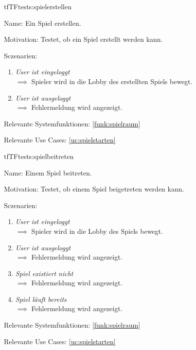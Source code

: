 \begin{description}[leftmargin=5em, style=sameline]
\begin{lhp}{tf}{TF}{tests:spielerstellen}
	\item [Name:] Ein Spiel erstellen.
	\item [Motivation:] Testet, ob ein Spiel erstellt werden kann.
	\item [Sczenarien:] \hfill
		\begin{enumerate}
			\item \textit{User ist eingeloggt} \\ $\implies$ Spieler wird in die Lobby des erstellten Spiels bewegt.
			\item \textit{User ist ausgeloggt} \\ $\implies$ Fehlermeldung wird angezeigt.
		\end{enumerate}
	\item [Relevante Systemfunktionen:] \ref{funk:spielraum}
	\item [Relevante Use Cases:] \ref{uc:spielstarten}
\end{lhp}

\begin{lhp}{tf}{TF}{tests:spielbeitreten}
	\item [Name:] Einem Spiel beitreten.
	\item [Motivation:] Testet, ob einem Spiel beigetreten werden kann.
	\item [Sczenarien:] \hfill
		\begin{enumerate}
			\item \textit{User ist eingeloggt} \\ $\implies$ Spieler wird in die Lobby des Spiels bewegt.
			\item \textit{User ist ausgeloggt} \\ $\implies$ Fehlermeldung wird angezeigt.
			\item \textit{Spiel existiert nicht} \\ $\implies$ Fehlermeldung wird angezeigt.
			\item \textit{Spiel läuft bereits} \\ $\implies$ Fehlermeldung wird angezeigt.
		\end{enumerate}
	\item [Relevante Systemfunktionen:] \ref{funk:spielraum}
	\item [Relevante Use Cases:] \ref{uc:spielstarten}
\end{lhp}


\end{description}
